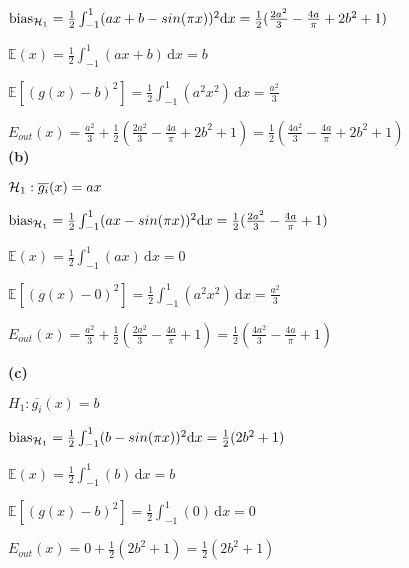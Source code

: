$\text{bias}_{{\cal H}_1} = \frac{1}{2} \int_{-1}^{1} (ax + b - sin(\pi x))^2 \mathrm{d}x = \frac{1}{2} (\frac{2a^2}{3} - \frac{4a}{\pi}+ 2b^2 + 1)$

$\mathbb{E}(x) = \frac{1}{2} \int_{-1}^{1} \! (ax + b)\, \mathrm{d}x = b$

$\mathbb{E}[( g(x) - b)^2] = \frac{1}{2} \int_{-1}^{1} \! (a^2x^2)\, \mathrm{d}x = \frac{a^2}{3}$

$E_{out} (x) = \frac{a^2}{3} + \frac{1}{2} (\frac{2a^2}{3} - \frac{4a}{\pi}+ 2b^2 + 1)
= \frac{1}{2} (\frac{4a^2}{3} - \frac{4a}{\pi}+ 2b^2 + 1)$
\\

\textbf{(b)} 

$\mathcal{H}_1: \overline{g_i}(x) = ax$

$\text{bias}_{{\cal H}_1} = \frac{1}{2} \int_{-1}^{1} (ax - sin(\pi x))^2 \mathrm{d}x = \frac{1}{2} (\frac{2a^2}{3} - \frac{4a}{\pi}+ 1)$

$\mathbb{E}(x) = \frac{1}{2} \int_{-1}^{1} \! (ax)\, \mathrm{d}x = 0$

$\mathbb{E}[( g(x)-0)^2] = \frac{1}{2} \int_{-1}^{1} \! (a^2x^2)\, \mathrm{d}x = \frac{a^2}{3}$

$E_{out} (x) = \frac{a^2}{3} + \frac{1}{2} (\frac{2a^2}{3} - \frac{4a}{\pi}+ 1)
= \frac{1}{2} (\frac{4a^2}{3} - \frac{4a}{\pi}+ 1)$


\textbf{(c)}
 
$H_1: \overline{g_i}(x) = b$


$\text{bias}_{{\cal H}_1} = \frac{1}{2} \int_{-1}^{1} (b - sin(\pi x))^2 \mathrm{d}x = \frac{1}{2} (2b^2 + 1)$

$\mathbb{E}(x) = \frac{1}{2} \int_{-1}^{1} \! (b)\, \mathrm{d}x = b$

$\mathbb{E}[(g(x) - b)^{2}] = \frac{1}{2} \int_{-1}^{1} \! (0)\, \mathrm{d}x = 0$

$E_{out} (x) = 0 + \frac{1}{2} (2b^2 + 1)
= \frac{1}{2} (2b^2 + 1)$
